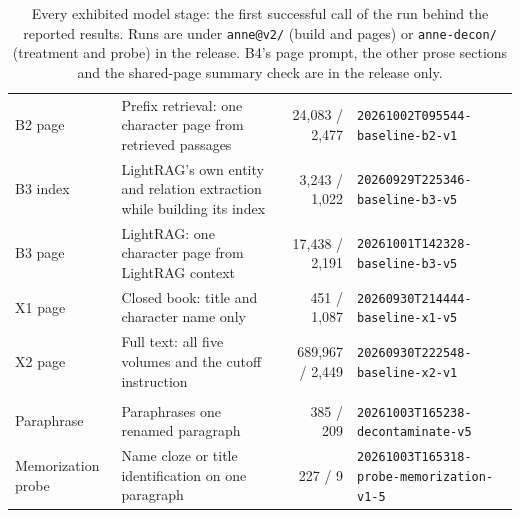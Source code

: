 \begin{table}[t]
\begin{tabular}{@{}>{\raggedright\arraybackslash}p{3.0cm}>{\raggedright\arraybackslash}p{6.3cm}r>{\raggedright\arraybackslash}p{3.75cm}@{}}
B2 page & Prefix retrieval: one character page from retrieved passages & 24,083 / 2,477 & \nolinkurl{20261002T095544-baseline-b2-v1} \\
B3 index & LightRAG's own entity and relation extraction while building its index & 3,243 / 1,022 & \nolinkurl{20260929T225346-baseline-b3-v5} \\
B3 page & LightRAG: one character page from LightRAG context & 17,438 / 2,191 & \nolinkurl{20261001T142328-baseline-b3-v5} \\
X1 page & Closed book: title and character name only & 451 / 1,087 & \nolinkurl{20260930T214444-baseline-x1-v5} \\
X2 page & Full text: all five volumes and the cutoff instruction & 689,967 / 2,449 & \nolinkurl{20260930T222548-baseline-x2-v1} \\
\midrule
\multicolumn{4}{@{}l}{\emph{Treated text and recognition}} \\
Paraphrase & Paraphrases one renamed paragraph & 385 / 209 & \nolinkurl{20261003T165238-decontaminate-v5} \\
Memorization probe & Name cloze or title identification on one paragraph & 227 / 9 & \nolinkurl{20261003T165318-probe-memorization-v1-5} \\
\bottomrule
\end{tabular}
\caption{Every exhibited model stage: the first successful call of the run behind the reported
results. Runs are under \nolinkurl{anne@v2/} (build and pages) or \nolinkurl{anne-decon/}
(treatment and probe) in the release. B4's page prompt, the other prose sections and the
shared-page summary check are in the release only.}
\label{tab:prompt-stages}
\end{table}

